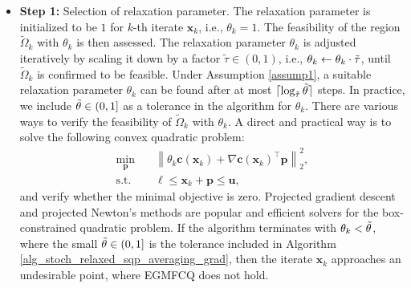 \documentclass[aos]{imsart}
\numberwithin{equation}{section}
\theoremstyle{plain}
\begin{document}
\begin{itemize}
    \item \textbf{Step 1:} Selection of relaxation parameter. The relaxation parameter is initialized to be $1$ for $k$-th iterate $\bm{x}_k$, i.e., $\theta_k = 1$. 
    The feasibility of the region $\widetilde{\Omega}_k$ with $\theta_k$ is then assessed. The relaxation parameter $\theta_k$ is adjusted iteratively by scaling it down by a factor $\tilde{\tau} \in (0,1)$, i.e., $\theta_k \leftarrow \theta_k \cdot \Tilde{\tau}$, until $\widetilde{\Omega}_k$ is confirmed to be feasible. 
    Under Assumption \ref{assump1}, a suitable relaxation parameter $\theta_k$ can be found after at most $\lceil \log_{\Tilde{\tau}} \Tilde{\theta} \rceil$ steps. In practice, we include $\Tilde{\theta} \in (0,1]$ as a tolerance in the algorithm for $\theta_k$. There are various ways to verify the feasibility of $\widetilde{\Omega}_k$ with $\theta_k$. A direct and practical way is to solve the following convex quadratic problem:
    \begin{equation*}
    \begin{split}
        \min_{\bm{p}} &  \hspace{1em} \left\| \theta_k \bm{c}(\bm{x}_k)+\nabla \bm{c}(\bm{x}_k)^{\top}\bm{p} \right\|_2^2,\\
        \text{s.t.} & \hspace{1em} \bm{\ell} \leq \bm{x}_k + \bm{p} \leq \bm{u},
    \end{split}
    \end{equation*}
    and verify whether the minimal objective is zero. Projected gradient descent and projected Newton's methods are popular and efficient solvers for the box-constrained quadratic problem. If the algorithm terminates with $\theta_k < \Tilde{\theta}$, where the small $\Tilde{\theta} \in (0,1]$ is the tolerance included in Algorithm \ref{alg_stoch_relaxed_sqp_averaging_grad}, then the iterate $\bm{x}_k$ approaches an undesirable point, where EGMFCQ does not hold. 


\end{itemize}
\end{document}
